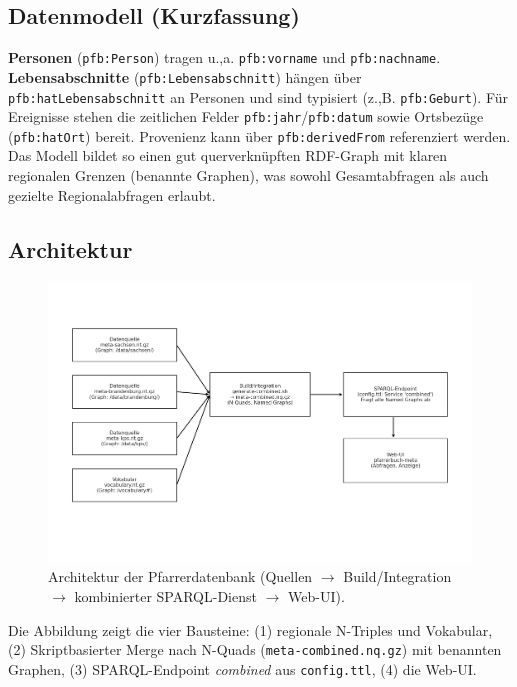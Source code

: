\subsection{Datenmodell (Kurzfassung)}
\textbf{Personen} (\texttt{pfb:Person}) tragen u.,a. \texttt{pfb:vorname} und \texttt{pfb:nachname}. \textbf{Lebensabschnitte}
(\texttt{pfb:Lebensabschnitt}) hängen über \texttt{pfb:hatLebensabschnitt} an Personen und sind typisiert
(z.,B. \texttt{pfb:Geburt}). Für Ereignisse stehen die zeitlichen Felder \texttt{pfb:jahr}/\texttt{pfb:datum} sowie Ortsbezüge
(\texttt{pfb:hatOrt}) bereit. Provenienz kann über \texttt{pfb:derivedFrom} referenziert werden. Das Modell bildet so einen gut querverknüpften RDF-Graph mit klaren regionalen Grenzen (benannte Graphen), was sowohl Gesamtabfragen als auch gezielte Regionalabfragen erlaubt.

\subsection{Architektur}
\begin{figure}[h]
\centering
\includegraphics[width=\linewidth]{Abbildungen/Aufbau_Pfarrerdatenbank.jpg}
\caption{Architektur der Pfarrerdatenbank (Quellen $\rightarrow$ Build/Integration $\rightarrow$ kombinierter SPARQL-Dienst $\rightarrow$ Web-UI).}
\label{fig:pfarrer-architektur}
\end{figure}

\noindent Die Abbildung zeigt die vier Bausteine: (1) regionale N-Triples und Vokabular, (2) Skriptbasierter Merge nach N-Quads
(\texttt{meta-combined.nq.gz}) mit benannten Graphen, (3) SPARQL-Endpoint \emph{combined} aus \texttt{config.ttl}, (4) die Web-UI.

